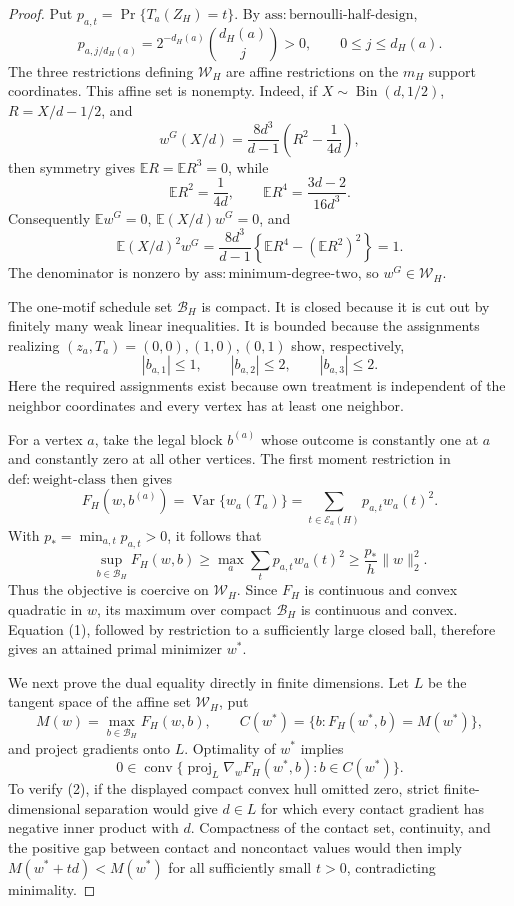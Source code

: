 \documentclass{article}
\begin{document}
\begin{proof}
Put \(p_{a,t}=\Pr\{T_a(Z_H)=t\}\).  By \(\mathrm{ass:bernoulli\text{-}half\text{-}design}\),
\[
p_{a,j/d_H(a)}=2^{-d_H(a)}\binom{d_H(a)}j>0,
\qquad 0\le j\le d_H(a).
\]
The three restrictions defining \(\mathcal W_H\) are affine restrictions on the \(m_H\) support coordinates.  This affine set is nonempty.  Indeed, if \(X\sim\operatorname{Bin}(d,1/2)\), \(R=X/d-1/2\), and
\[
w^G(X/d)=\frac{8d^3}{d-1}\left(R^2-\frac1{4d}\right),
\]
then symmetry gives \(\mathbb E R=\mathbb E R^3=0\), while
\[
\mathbb E R^2=\frac1{4d},
\qquad
\mathbb E R^4=\frac{3d-2}{16d^3}.
\]
Consequently \(\mathbb Ew^G=0\), \(\mathbb E(X/d)w^G=0\), and
\[
\mathbb E(X/d)^2w^G
=\frac{8d^3}{d-1}\left\{\mathbb ER^4-(\mathbb ER^2)^2\right\}=1.
\]
The denominator is nonzero by \(\mathrm{ass:minimum\text{-}degree\text{-}two}\), so \(w^G\in\mathcal W_H\).

The one-motif schedule set \(\mathcal B_H\) is compact.  It is closed because it is cut out by finitely many weak linear inequalities.  It is bounded because the assignments realizing \((z_a,T_a)=(0,0),(1,0),(0,1)\) show, respectively,
\[
|b_{a,1}|\le1,
\qquad |b_{a,2}|\le2,
\qquad |b_{a,3}|\le2.
\]
Here the required assignments exist because own treatment is independent of the neighbor coordinates and every vertex has at least one neighbor.

For a vertex \(a\), take the legal block \(b^{(a)}\) whose outcome is constantly one at \(a\) and constantly zero at all other vertices.  The first moment restriction in \(\mathrm{def:weight\text{-}class}\) then gives
\[
F_H(w,b^{(a)})
=\operatorname{Var}\{w_a(T_a)\}
=\sum_{t\in\mathcal E_a(H)}p_{a,t}w_a(t)^2.
\]
With \(p_*=\min_{a,t}p_{a,t}>0\), it follows that
\[
\sup_{b\in\mathcal B_H}F_H(w,b)
\ge \max_a\sum_t p_{a,t}w_a(t)^2
\ge \frac{p_*}{h}\|w\|_2^2. \tag{1}
\]
Thus the objective is coercive on \(\mathcal W_H\).  Since \(F_H\) is continuous and convex quadratic in \(w\), its maximum over compact \(\mathcal B_H\) is continuous and convex.  Equation (1), followed by restriction to a sufficiently large closed ball, therefore gives an attained primal minimizer \(w^*\).

We next prove the dual equality directly in finite dimensions.  Let \(L\) be the tangent space of the affine set \(\mathcal W_H\), put
\[
M(w)=\max_{b\in\mathcal B_H}F_H(w,b),
\qquad
C(w^*)=\{b:F_H(w^*,b)=M(w^*)\},
\]
and project gradients onto \(L\).  Optimality of \(w^*\) implies
\[
0\in\operatorname{conv}\{\operatorname{proj}_L\nabla_wF_H(w^*,b):b\in C(w^*)\}. \tag{2}
\]
To verify (2), if the displayed compact convex hull omitted zero, strict finite-dimensional separation would give \(d\in L\) for which every contact gradient has negative inner product with \(d\).  Compactness of the contact set, continuity, and the positive gap between contact and noncontact values would then imply \(M(w^*+td)<M(w^*)\) for all sufficiently small \(t>0\), contradicting minimality.


\end{proof}
\end{document}
